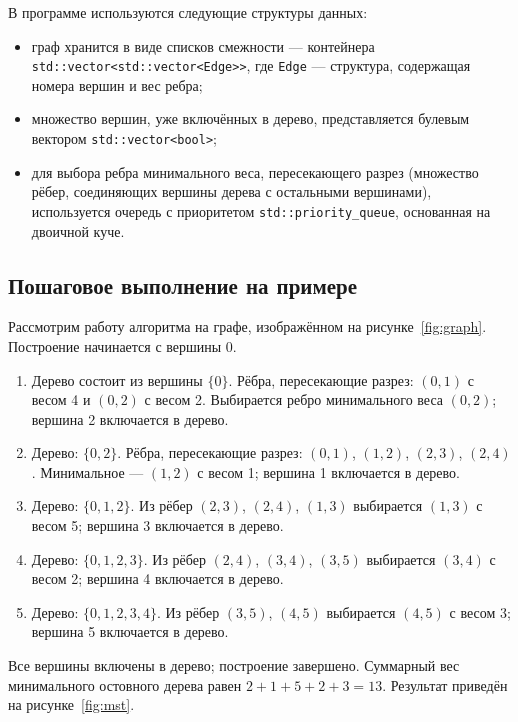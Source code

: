 \documentclass[a4paper,14pt]{extarticle}
\begin{document}
В программе используются следующие структуры данных:
\begin{itemize}
  \item граф хранится в виде списков смежности --- контейнера
        \texttt{std::vector<std::vector<Edge>>}, где \texttt{Edge} ---
        структура, содержащая номера вершин и вес ребра;
  \item множество вершин, уже включённых в дерево, представляется булевым
        вектором \texttt{std::vector<bool>};
  \item для выбора ребра минимального веса, пересекающего разрез (множество
        рёбер, соединяющих вершины дерева с остальными вершинами),
        используется очередь с приоритетом \texttt{std::priority\_queue},
        основанная на двоичной куче.
\end{itemize}

\subsection{Пошаговое выполнение на примере}

Рассмотрим работу алгоритма на графе, изображённом на
рисунке~\ref{fig:graph}. Построение начинается с вершины 0.

\begin{enumerate}
  \item Дерево состоит из вершины $\{0\}$. Рёбра, пересекающие разрез:
        $(0,1)$ с весом 4 и $(0,2)$ с весом 2. Выбирается ребро минимального
        веса $(0,2)$; вершина 2 включается в дерево.
  \item Дерево: $\{0,2\}$. Рёбра, пересекающие разрез: $(0,1)$, $(1,2)$,
        $(2,3)$, $(2,4)$. Минимальное --- $(1,2)$ с весом 1; вершина 1
        включается в дерево.
  \item Дерево: $\{0,1,2\}$. Из рёбер $(2,3)$, $(2,4)$, $(1,3)$ выбирается
        $(1,3)$ с весом 5; вершина 3 включается в дерево.
  \item Дерево: $\{0,1,2,3\}$. Из рёбер $(2,4)$, $(3,4)$, $(3,5)$ выбирается
        $(3,4)$ с весом 2; вершина 4 включается в дерево.
  \item Дерево: $\{0,1,2,3,4\}$. Из рёбер $(3,5)$, $(4,5)$ выбирается $(4,5)$
        с весом 3; вершина 5 включается в дерево.
\end{enumerate}

Все вершины включены в дерево; построение завершено. Суммарный вес
минимального остовного дерева равен $2+1+5+2+3=13$. Результат приведён на
рисунке~\ref{fig:mst}.
\end{document}
